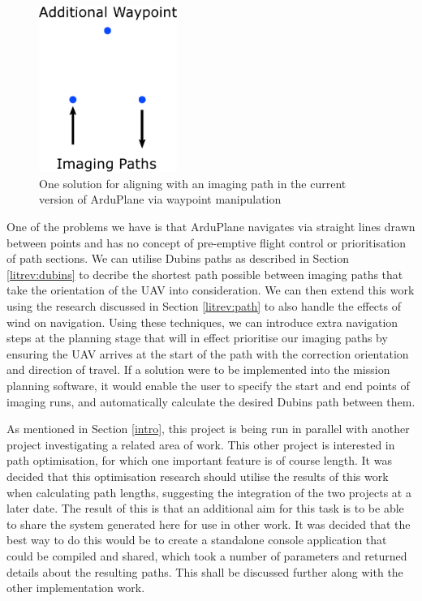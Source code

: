 \begin{figure}[htbp!] 
\centering    
\includegraphics[width=0.4\textwidth]{WaypointManipulation}
\caption[Aligning With an Imaging Path in Stock ArduPlane]{One solution for aligning with an imaging path in the current version of ArduPlane via waypoint manipulation}
\label{fig:waypoingmanipulation}
\end{figure}

One of the problems we have is that ArduPlane navigates via straight lines drawn between points and has no concept of pre-emptive flight control or prioritisation of path sections. We can utilise Dubins paths as described in Section \ref{litrev:dubins} to decribe the shortest path possible between imaging paths that take the orientation of the UAV into consideration. We can then extend this work using the research discussed in Section \ref{litrev:path} to also handle the effects of wind on navigation. Using these techniques, we can introduce extra navigation steps at the planning stage that will in effect prioritise our imaging paths by ensuring the UAV arrives at the start of the path with the correction orientation and direction of travel. If a solution were to be implemented into the mission planning software, it would enable the user to specify the start and end points of imaging runs, and automatically calculate the desired Dubins path between them. 

As mentioned in Section \ref{intro}, this project is being run in parallel with another project investigating a related area of work. This other project is interested in path optimisation, for which one important feature is of course length. It was decided that this optimisation research should utilise the results of this work when calculating path lengths, suggesting the integration of the two projects at a later date. The result of this is that an additional aim for this task is to be able to share the system generated here for use in other work. It was decided that the best way to do this would be to create a standalone console application that could be compiled and shared, which took a number of parameters and returned details about the resulting paths. This shall be discussed further along with the other implementation work.

